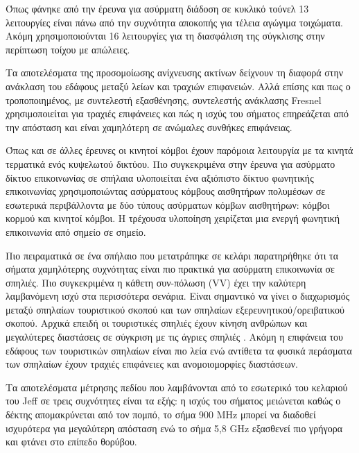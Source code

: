         Όπως φάνηκε από την έρευνα για ασύρματη διάδοση σε κυκλικό τούνελ \cite{dudley_wireless_2005}
        13 λειτουργίες είναι πάνω από την συχνότητα αποκοπής για τέλεια αγώγιμα τοιχώματα. Ακόμη
        χρησιμοποιούνται 16 λειτουργίες για τη διασφάλιση της σύγκλισης στην περίπτωση τοίχου 
        με απώλειες.

        Τα αποτελέσματα της προσομοίωσης ανίχνευσης ακτίνων \cite{soo_investigation_2018} δείχνουν
        τη διαφορά στην ανάκλαση του εδάφους μεταξύ λείων και τραχιών επιφανειών. Αλλά επίσης και
        πως ο τροποποιημένος, με συντελεστή εξασθένησης, συντελεστής ανάκλασης Fresnel χρησιμοποιείται
        για τραχιές επιφάνειες και πώς η ισχύς του σήματος επηρεάζεται από την απόσταση και είναι 
        χαμηλότερη σε ανώμαλες συνθήκες επιφάνειας.

        Όπως και σε άλλες έρευνες οι κινητοί κόμβοι έχουν παρόμοια λειτουργία με τα κινητά τερματικά
        ενός κυψελωτού δικτύου. Πιο συγκεκριμένα στην έρευνα για ασύρματο δίκτυο επικοινωνίας σε
        σπήλαια \cite{yavuz_-cave_2009} υλοποιείται ένα αξιόπιστο δίκτυο φωνητικής επικοινωνίας
        χρησιμοποιώντας ασύρματους κόμβους αισθητήρων πολυμέσων σε εσωτερικά περιβάλλοντα με δύο
        τύπους ασύρματων κόμβων αισθητήρων: κόμβοι κορμού και κινητοί κόμβοι. Η τρέχουσα υλοποίηση
        χειρίζεται μια ενεργή φωνητική επικοινωνία από σημείο σε σημείο.

        Πιο πειραματικά σε ένα σπήλαιο που μετατράπηκε σε κελάρι \cite{soo_propagation_2018}
        παρατηρήθηκε ότι τα σήματα χαμηλότερης συχνότητας είναι πιο πρακτικά για ασύρματη
        επικοινωνία σε σπηλιές. Πιο συγκεκριμένα η κάθετη συν-πόλωση (VV) έχει την καλύτερη
        λαμβανόμενη ισχύ στα περισσότερα σενάρια.
        Είναι σημαντικό να γίνει ο διαχωρισμός μεταξύ σπηλαίων τουριστικού σκοπού και των σπηλαίων
        εξερευνητικού/ορειβατικού σκοπού. Αρχικά επειδή οι τουριστικές σπηλιές έχουν κίνηση ανθρώπων
        και μεγαλύτερες διαστάσεις σε σύγκριση με τις άγριες σπηλιές \cite{soo_propagation_2018}.
        Ακόμη η επιφάνεια του εδάφους των τουριστικών σπηλαίων είναι πιο λεία ενώ αντίθετα τα φυσικά
        περάσματα των σπηλαίων έχουν τραχιές επιφάνειες και ανομοιομορφίες διαστάσεων.

        Τα αποτελέσματα μέτρησης πεδίου που λαμβάνονται από το εσωτερικό του κελαριού του
        Jeff \cite{soo_propagation_2018} σε τρεις συχνότητες είναι τα εξής: η ισχύς του σήματος
        μειώνεται καθώς ο δέκτης απομακρύνεται από τον πομπό, το σήμα 900 MHz μπορεί να διαδοθεί
        ισχυρότερα για μεγαλύτερη απόσταση ενώ το σήμα 5,8 GHz εξασθενεί πιο γρήγορα και φτάνει στο 
        επίπεδο θορύβου.

